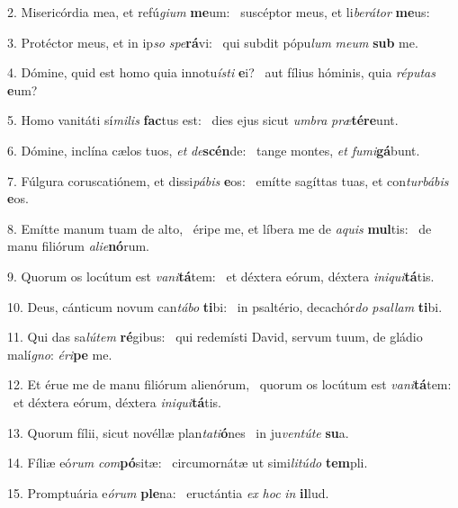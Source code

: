 2. Misericórdia mea, et refú\textit{gi}\textit{um} \textbf{me}um: \ast\  suscéptor meus, et li\textit{be}\textit{rá}\textit{tor} \textbf{me}us:\

3. Protéctor meus, et in ip\textit{so} \textit{spe}\textbf{rá}vi: \ast\  qui subdit pópu\textit{lum} \textit{me}\textit{um} \textbf{sub} me.\

4. Dómine, quid est homo quia innotu\textit{ís}\textit{ti} \textbf{e}i? \ast\  aut fílius hóminis, quia \textit{ré}\textit{pu}\textit{tas} \textbf{e}um?\

5. Homo vanitáti sí\textit{mi}\textit{lis} \textbf{fac}tus est: \ast\  dies ejus sicut \textit{um}\textit{bra} \textit{præ}\textbf{tér}\textbf{e}unt.\

6. Dómine, inclína cælos tuos, \textit{et} \textit{de}\textbf{scén}de: \ast\  tange montes, \textit{et} \textit{fu}\textit{mi}\textbf{gá}bunt.\

7. Fúlgura coruscatiónem, et dissi\textit{pá}\textit{bis} \textbf{e}os: \ast\  emítte sagíttas tuas, et con\textit{tur}\textit{bá}\textit{bis} \textbf{e}os.\

8. Emítte manum tuam de alto, \dag\  éripe me, et líbera me de \textit{a}\textit{quis} \textbf{mul}tis: \ast\  de manu filiórum \textit{a}\textit{li}\textit{e}\textbf{nó}rum.\

9. Quorum os locútum est \textit{va}\textit{ni}\textbf{tá}tem: \ast\  et déxtera eórum, déxtera \textit{in}\textit{i}\textit{qui}\textbf{tá}tis.\

10. Deus, cánticum novum can\textit{tá}\textit{bo} \textbf{ti}bi: \ast\  in psaltério, decachór\textit{do} \textit{psal}\textit{lam} \textbf{ti}bi.\

11. Qui das sa\textit{lú}\textit{tem} \textbf{ré}gibus: \ast\  qui redemísti David, servum tuum, de gládio malí\textit{gno}: \textit{é}\textit{ri}\textbf{pe} me.\

12. Et érue me de manu filiórum alienórum, \dag\  quorum os locútum est \textit{va}\textit{ni}\textbf{tá}tem: \ast\  et déxtera eórum, déxtera \textit{in}\textit{i}\textit{qui}\textbf{tá}tis.\

13. Quorum fílii, sicut novéllæ plan\textit{ta}\textit{ti}\textbf{ó}nes \ast\  in ju\textit{ven}\textit{tú}\textit{te} \textbf{su}a.\

14. Fíliæ eó\textit{rum} \textit{com}\textbf{pó}sitæ: \ast\  circumornátæ ut simi\textit{li}\textit{tú}\textit{do} \textbf{tem}pli.\

15. Promptuária e\textit{ó}\textit{rum} \textbf{ple}na: \ast\  eructántia \textit{ex} \textit{hoc} \textit{in} \textbf{il}lud.\


